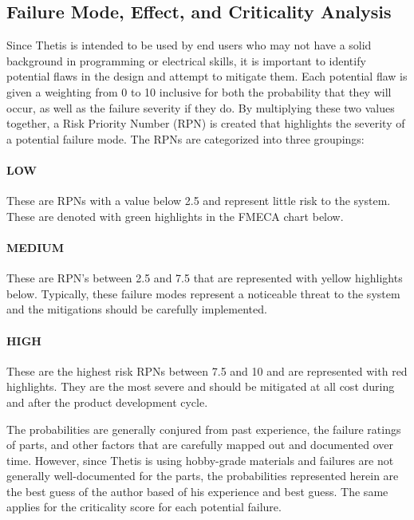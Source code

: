 \subsection{Failure Mode, Effect, and Criticality Analysis} \label{ssec:fmeca}
Since Thetis is intended to be used by end users who may not have a solid background in programming or electrical skills, it is important to identify potential flaws in the design and attempt to mitigate them.
Each potential flaw is given a weighting from 0 to 10 inclusive for both the probability that they will occur, as well as the failure severity if they do. By multiplying these two values together, a Risk Priority Number (RPN) is created that highlights the severity of a potential failure mode. The RPNs are categorized into three groupings:

\paragraph*{LOW} These are RPNs with a value below 2.5 and represent little risk to the system. 
These are denoted with green highlights in the FMECA chart below.

\paragraph*{MEDIUM} These are RPN's between 2.5 and 7.5 that are represented with yellow highlights below.
Typically, these failure modes represent a noticeable threat to the system and the mitigations should be carefully implemented.

\paragraph*{HIGH} These are the highest risk RPNs between 7.5 and 10 and are represented with red highlights.
They are the most severe and should be mitigated at all cost during and after the product development cycle.

The probabilities are generally conjured from past experience, the failure ratings of parts, and other factors that are carefully mapped out and documented over time.
However, since Thetis is using hobby-grade materials and failures are not generally well-documented for the parts, the probabilities represented herein are the best guess of the author based of his experience and best guess.
The same applies for the criticality score for each potential failure.

